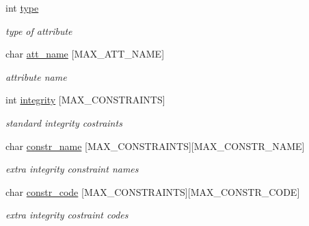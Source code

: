 \begin{DoxyCompactItemize}
\item 
\hypertarget{structAK__header_a88b9d916b6efa4ba9408ead73ad5bd02}{int \hyperlink{structAK__header_a88b9d916b6efa4ba9408ead73ad5bd02}{type}}\label{structAK__header_a88b9d916b6efa4ba9408ead73ad5bd02}

\begin{DoxyCompactList}\small\item\em type of attribute \end{DoxyCompactList}\item 
\hypertarget{structAK__header_aa0d9f18802106957caa6661e4661d0d5}{char \hyperlink{structAK__header_aa0d9f18802106957caa6661e4661d0d5}{att\+\_\+name} \mbox{[}M\+A\+X\+\_\+\+A\+T\+T\+\_\+\+N\+A\+M\+E\mbox{]}}\label{structAK__header_aa0d9f18802106957caa6661e4661d0d5}

\begin{DoxyCompactList}\small\item\em attribute name \end{DoxyCompactList}\item 
\hypertarget{structAK__header_a1a420a74bf00556e0258e963e5021e28}{int \hyperlink{structAK__header_a1a420a74bf00556e0258e963e5021e28}{integrity} \mbox{[}M\+A\+X\+\_\+\+C\+O\+N\+S\+T\+R\+A\+I\+N\+T\+S\mbox{]}}\label{structAK__header_a1a420a74bf00556e0258e963e5021e28}

\begin{DoxyCompactList}\small\item\em standard integrity costraints \end{DoxyCompactList}\item 
\hypertarget{structAK__header_aafa6aa96730559127dd491f7aef8f85c}{char \hyperlink{structAK__header_aafa6aa96730559127dd491f7aef8f85c}{constr\+\_\+name} \mbox{[}M\+A\+X\+\_\+\+C\+O\+N\+S\+T\+R\+A\+I\+N\+T\+S\mbox{]}\mbox{[}M\+A\+X\+\_\+\+C\+O\+N\+S\+T\+R\+\_\+\+N\+A\+M\+E\mbox{]}}\label{structAK__header_aafa6aa96730559127dd491f7aef8f85c}

\begin{DoxyCompactList}\small\item\em extra integrity constraint names \end{DoxyCompactList}\item 
\hypertarget{structAK__header_af41ddb22d1a06285bc4a74d8be3d66b6}{char \hyperlink{structAK__header_af41ddb22d1a06285bc4a74d8be3d66b6}{constr\+\_\+code} \mbox{[}M\+A\+X\+\_\+\+C\+O\+N\+S\+T\+R\+A\+I\+N\+T\+S\mbox{]}\mbox{[}M\+A\+X\+\_\+\+C\+O\+N\+S\+T\+R\+\_\+\+C\+O\+D\+E\mbox{]}}\label{structAK__header_af41ddb22d1a06285bc4a74d8be3d66b6}

\begin{DoxyCompactList}\small\item\em extra integrity costraint codes \end{DoxyCompactList}\end{DoxyCompactItemize}


